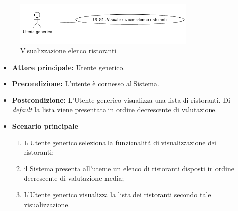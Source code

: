 \label{usecase:Visualizzazione elenco ristoranti}

\begin{figure}[h]
	\centering
	\includegraphics[width=0.8\textwidth]{./uml/UCG1.png} 
	\caption{Visualizzazione elenco ristoranti}
	\label{fig:UCG1}
  \end{figure}

\begin{itemize}
	\item \textbf{Attore principale:} Utente generico.

	\item \textbf{Precondizione:}
	      L'utente è connesso al Sistema.

	\item \textbf{Postcondizione:} L'Utente generico visualizza una lista di
	      ristoranti. Di \textit{default} la lista viene presentata in ordine decrescente di valutazione.

	\item \textbf{Scenario principale:}
	      \begin{enumerate}
		      \item L'Utente generico seleziona la funzionalità di
		            visualizzazione dei ristoranti;

		      \item il Sistema presenta all'utente un elenco di ristoranti disposti in ordine decrescente di valutazione media;

		      \item L'Utente generico visualizza la lista dei ristoranti secondo tale visualizzazione.

	      \end{enumerate}
\end{itemize}
